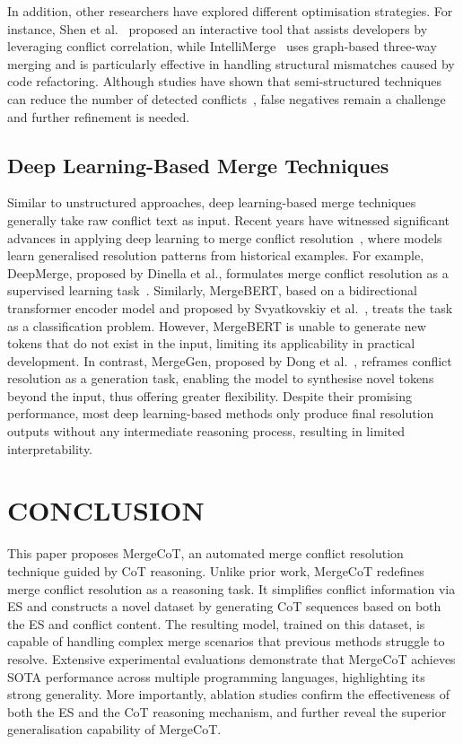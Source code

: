 \documentclass[sigconf,review,anonymous]{acmart}
\begin{document}
In addition, other researchers have explored different optimisation strategies. For instance, Shen et al.~\cite{r9} proposed an interactive tool that assists developers by leveraging conflict correlation, while IntelliMerge~\cite{10} uses graph-based three-way merging and is particularly effective in handling structural mismatches caused by code refactoring. Although studies have shown that semi-structured techniques can reduce the number of detected conflicts~\cite{r11}, false negatives remain a challenge and further refinement is needed.

\subsection{Deep Learning-Based Merge Techniques}
Similar to unstructured approaches, deep learning-based merge techniques generally take raw conflict text as input. Recent years have witnessed significant advances in applying deep learning to merge conflict resolution~\cite{r12, r13}, where models learn generalised resolution patterns from historical examples.
For example, DeepMerge, proposed by Dinella et al., formulates merge conflict resolution as a supervised learning task~\cite{deepmerge}. 
Similarly, MergeBERT, based on a bidirectional transformer encoder model and proposed by Svyatkovskiy et al.~\cite{mergebert}, treats the task as a classification problem. However, MergeBERT is unable to generate new tokens that do not exist in the input, limiting its applicability in practical development. In contrast, MergeGen, proposed by Dong et al.~\cite{mergegen}, reframes conflict resolution as a generation task, enabling the model to synthesise novel tokens beyond the input, thus offering greater flexibility.
Despite their promising performance, most deep learning-based methods only produce final resolution outputs without any intermediate reasoning process, resulting in limited interpretability.


\section{CONCLUSION}
This paper proposes MergeCoT, an automated merge conflict resolution technique guided by CoT reasoning. Unlike prior work, MergeCoT redefines merge conflict resolution as a reasoning task. It simplifies conflict information via ES and constructs a novel dataset by generating CoT sequences based on both the ES and conflict content. The resulting model, trained on this dataset, is capable of handling complex merge scenarios that previous methods struggle to resolve.
Extensive experimental evaluations demonstrate that MergeCoT achieves SOTA performance across multiple programming languages, highlighting its strong generality. More importantly, ablation studies confirm the effectiveness of both the ES and the CoT reasoning mechanism, and further reveal the superior generalisation capability of MergeCoT.




\end{document}
